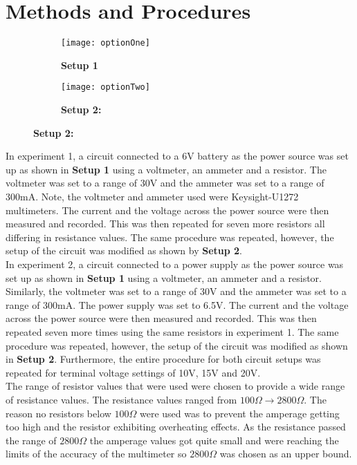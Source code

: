 \documentclass[
	letterpaper, %
	10pt, %
]{CSUniSchoolLabReport}
\begin{document}
\section{Methods and Procedures}
\begin{figure}[H]
    \centering
	\begin{subfigure}{0.45\textwidth}
		\texttt{[image: optionOne]}
		\caption{\textbf{Setup 1}}
	\end{subfigure}
	\begin{subfigure}{0.45\textwidth}
		\texttt{[image: optionTwo]}
		\caption{\textbf{Setup 2:}}
	\end{subfigure}
\end{figure}

In experiment 1, a circuit connected to a 6V battery as the power source was set up as shown in \textbf{Setup 1} using a voltmeter, an ammeter and a resistor. The voltmeter was set to a range of 30V and the ammeter was set to a range of 300mA. Note, the voltmeter and ammeter used were Keysight-U1272 multimeters. The current and the voltage across the power source were then measured and recorded. This was then repeated for seven more resistors all differing in resistance values. The same procedure was repeated, however, the setup of the circuit was modified as shown by \textbf{Setup 2}.\\

In experiment 2, a circuit connected to a power supply as the power source was set up as shown in \textbf{Setup 1} using a voltmeter, an ammeter and a resistor. Similarly, the voltmeter was set to a range of 30V and the ammeter was set to a range of 300mA. The power supply was set to 6.5V. The current and the voltage across the power source were then measured and recorded. This was then repeated seven more times using the same resistors in experiment 1. The same procedure was repeated, however, the setup of the circuit was modified as shown in \textbf{Setup 2}.  Furthermore, the entire procedure for both circuit setups was repeated for terminal voltage settings of 10V, 15V and 20V. \\

The range of resistor values that were used were chosen to provide a wide range of resistance values. The
resistance values ranged from $100\Omega\rightarrow 2800\Omega$. The reason no resistors below $100\Omega$ were used was to prevent the amperage getting
too high and the resistor exhibiting overheating effects. As the resistance passed the range of $2800\Omega$ the
amperage values got quite small and were reaching the limits of the accuracy of the multimeter so $2800\Omega$
was chosen as an upper bound.\\
\newpage
\end{document}
